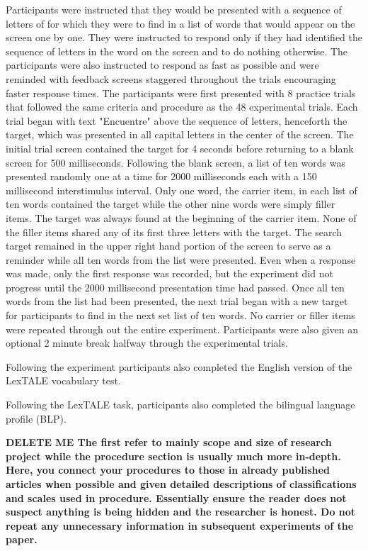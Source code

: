 Participants were instructed that they would be presented with a sequence of letters of for which they were to find in a list of words that would appear on the screen one by one. They were instructed to respond only if they had identified the sequence of letters in the word on the screen and to do nothing otherwise. The participants were also instructed to respond as fast as possible and were reminded with feedback screens staggered throughout the trials encouraging faster response times. The participants were first presented with 8 practice trials that followed the same criteria and procedure as the 48 experimental trials. Each trial began with text "Encuentre" above the sequence of letters, henceforth the target, which was presented in all capital letters in the center of the screen. The initial trial screen contained the target for 4 seconds before returning to a blank screen for 500 milliseconds. Following the blank screen, a list of ten words was presented randomly one at a time for 2000 milliseconds each with a 150 millisecond interstimulus interval. Only one word, the carrier item, in each list of ten words contained the target while the other nine words were simply filler items. The target was always found at the beginning of the carrier item. None of the filler items shared any of its first three letters with the target. The search target remained in the upper right hand portion of the screen to serve as a reminder while all ten words from the list were presented. Even when a response was made, only the first response was recorded, but the experiment did not progress until the 2000 millisecond presentation time had passed. Once all ten words from the list had been presented, the next trial began with a new target for participants to find in the next set list of ten words. No carrier or filler items were repeated through out the entire experiment. Participants were also given an optional 2 minute break halfway through the experimental trials.

Following the experiment participants also completed the English version of the LexTALE vocabulary test. 

Following the LexTALE task, participants also completed the bilingual language profile (BLP).


\textbf{DELETE ME
The first refer to mainly scope and size of research project while the procedure section is usually much more in-depth. Here, you connect your procedures to those in already published articles when possible and given detailed descriptions of classifications and scales used in procedure. Essentially ensure the reader does not suspect anything is being hidden and the researcher is honest. Do not repeat any unnecessary information in subsequent experiments of the paper.}


